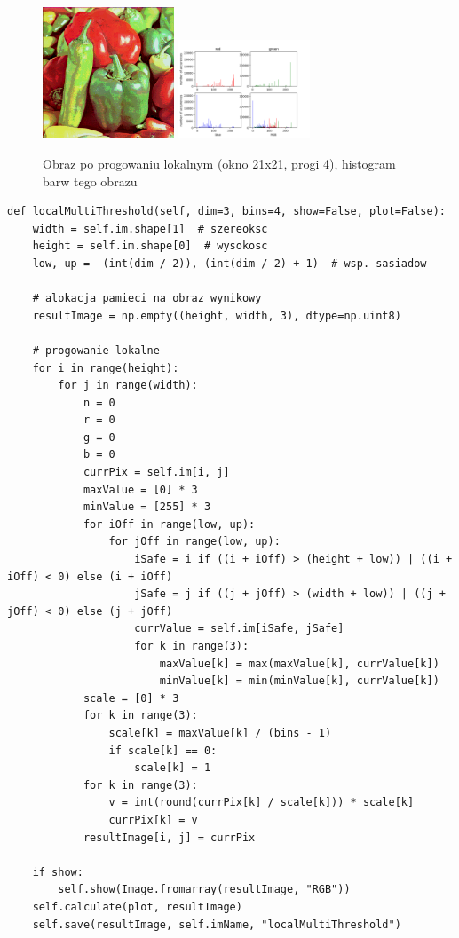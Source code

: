 \documentclass[final,a4paper,openany,12pt]{mwbk}
\begin{document}
\begin{figure}[H]
	\begin{center}
		\includegraphics[width=0.35\textwidth]{peppers_color_localMultiThreshold_result}
		\includegraphics[width=0.35\textwidth]{peppers_color_localMultiThreshold_histogram}
	\end{center}
\caption{Obraz po progowaniu lokalnym (okno 21x21, progi 4), histogram barw tego obrazu}
\end{figure}



\begin{lstlisting}[caption=Progowanie wielo-progowe lokalne]
def localMultiThreshold(self, dim=3, bins=4, show=False, plot=False):
	width = self.im.shape[1]  # szereoksc
	height = self.im.shape[0]  # wysokosc
	low, up = -(int(dim / 2)), (int(dim / 2) + 1)  # wsp. sasiadow
	
	# alokacja pamieci na obraz wynikowy
	resultImage = np.empty((height, width, 3), dtype=np.uint8)
	
	# progowanie lokalne
	for i in range(height):
		for j in range(width):
			n = 0
			r = 0
			g = 0
			b = 0
			currPix = self.im[i, j]
			maxValue = [0] * 3
			minValue = [255] * 3
			for iOff in range(low, up):
				for jOff in range(low, up):
					iSafe = i if ((i + iOff) > (height + low)) | ((i + iOff) < 0) else (i + iOff)
					jSafe = j if ((j + jOff) > (width + low)) | ((j + jOff) < 0) else (j + jOff)
					currValue = self.im[iSafe, jSafe]
					for k in range(3):
						maxValue[k] = max(maxValue[k], currValue[k])
						minValue[k] = min(minValue[k], currValue[k])
			scale = [0] * 3
			for k in range(3):
				scale[k] = maxValue[k] / (bins - 1)
				if scale[k] == 0:
					scale[k] = 1
			for k in range(3):
				v = int(round(currPix[k] / scale[k])) * scale[k]
				currPix[k] = v
			resultImage[i, j] = currPix
	
	if show:
		self.show(Image.fromarray(resultImage, "RGB"))
	self.calculate(plot, resultImage)
	self.save(resultImage, self.imName, "localMultiThreshold")
\end{lstlisting}
\end{document}
